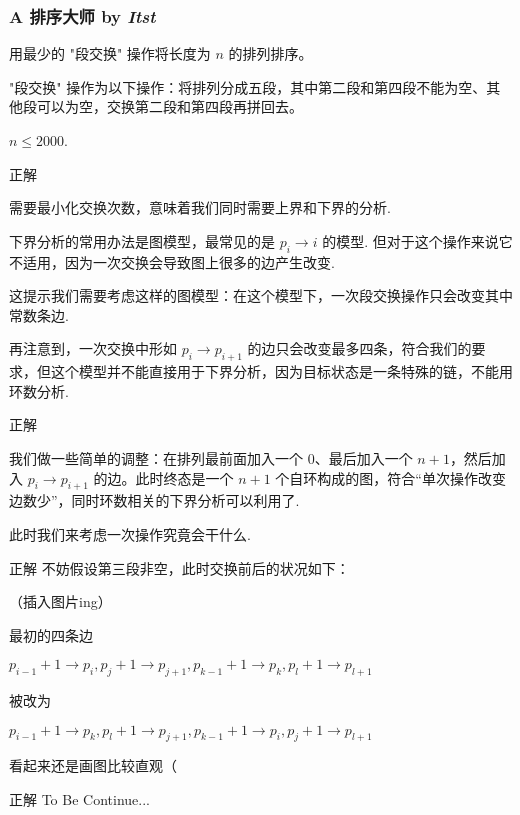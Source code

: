 \frame
{
  \frametitle{A 排序大师 {by \itshape Itst}}
	用最少的 "段交换" 操作将长度为 $n$ 的排列排序。
	
	"段交换" 操作为以下操作：将排列分成五段，其中第二段和第四段不能为空、其他段可以为空，交换第二段和第四段再拼回去。

	$n\le 2000$.
}

\begin{frame}{正解}

	需要最小化交换次数，意味着我们同时需要上界和下界的分析.

	下界分析的常用办法是图模型，最常见的是 $p_i\rightarrow i$ 的模型. 但对于这个操作来说它不适用，因为一次交换会导致图上很多的边产生改变. \pause

	这提示我们需要考虑这样的图模型：在这个模型下，一次段交换操作只会改变其中常数条边.

	再注意到，一次交换中形如 $p_i\rightarrow p_{i+1}$ 的边只会改变最多四条，符合我们的要求，但这个模型并不能直接用于下界分析，因为目标状态是一条特殊的链，不能用环数分析.

\end{frame}

\begin{frame}{正解}

	我们做一些简单的调整：在排列最前面加入一个 $0$、最后加入一个 $n+1$，然后加入 $p_i\rightarrow p_{i+1}$ 的边。此时终态是一个 ${n+1}$ 个自环构成的图，符合“单次操作改变边数少”，同时环数相关的下界分析可以利用了.

	此时我们来考虑一次操作究竟会干什么.

\end{frame}

\begin{frame}{正解}
	不妨假设第三段非空，此时交换前后的状况如下：

	（插入图片ing）

	最初的四条边


$p_{i-1}+1\rightarrow p_i, p_j+1\rightarrow p_{j+1}, p_{k-1}+1\rightarrow p_k, p_l+1\rightarrow p_{l+1}$

 	被改为

$p_{i-1}+1\rightarrow p_k, p_l+1\rightarrow p_{j+1}, p_{k-1}+1\rightarrow p_i, p_j+1\rightarrow p_{l+1}$

	看起来还是画图比较直观（

\end{frame}

\begin{frame}{正解}
To Be Continue...
\end{frame}